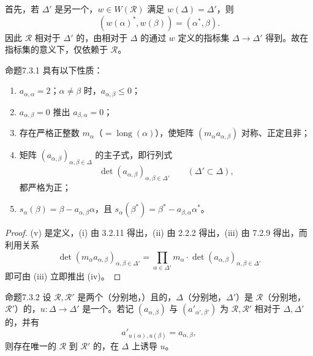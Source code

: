 首先，若 $\Delta'$ 是另一个，$w\in W(\mathscr R)$ 满足 $w(\Delta)=\Delta'$，则
\[(w(\alpha)^*,w(\beta))=(\alpha^*,\beta).\]
因此 $\mathscr R$ 相对于 $\Delta'$ 的，由相对于 $\Delta$ 的通过 $w$ 定义的指标集 $\Delta\to\Delta'$ 得到。故在指标集的意义下，仅依赖于 $\mathscr R$。
\begin{SGAresult}{命题}{7.3.1}
具有以下性质：
\begin{enumerate}
\item[(i)] $a_{\alpha,\alpha}=2$；$\alpha\ne\beta$ 时，$a_{\alpha,\beta}\leq0$；
\item[(ii)] $a_{\alpha,\beta}=0$ 推出 $a_{\beta,\alpha}=0$；
\item[(iii)] 存在严格正整数 $m_\alpha$（$=\operatorname{long}(\alpha)$），使矩阵 $(m_\alpha a_{\alpha,\beta})$ 对称、正定且非；
\item[(iv)] 矩阵 $(a_{\alpha,\beta})_{\alpha,\beta\in\Delta}$ 的主子式，即行列式
\[\det(a_{\alpha,\beta})_{\alpha,\beta\in\Delta'}\qquad(\Delta'\subset\Delta),\]
都严格为正；
\item[(v)] $s_\alpha(\beta)=\beta-a_{\alpha,\beta}\alpha$，且 $s_\alpha(\beta^*)=\beta^*-a_{\beta,\alpha}\alpha^*$。
\end{enumerate}
\end{SGAresult}
\begin{proof}
(v) 是定义，(i) 由 3.2.11 得出，(ii) 由 2.2.2 得出，(iii) 由 7.2.9 得出，而利用关系
\[\det(m_\alpha a_{\alpha,\beta})_{\alpha,\beta\in\Delta'}
=\prod_{\alpha\in\Delta'}m_\alpha\cdot\det(a_{\alpha,\beta})_{\alpha,\beta\in\Delta'}\]
即可由 (iii) 立即推出 (iv)。
\end{proof}
\begin{SGAresult}{命题}{7.3.2}
设 $\mathscr R,\mathscr R'$ 是两个（分别地，）且的，$\Delta$（分别地，$\Delta'$）是 $\mathscr R$（分别地，$\mathscr R'$）的，$u:\Delta\to\Delta'$ 是一个。若记 $(a_{\alpha,\beta})$ 与 $(a'_{\alpha',\beta'})$ 为 $\mathscr R,\mathscr R'$ 相对于 $\Delta,\Delta'$ 的，并有
\[a'_{u(\alpha),u(\beta)}=a_{\alpha,\beta},\]
则存在唯一的 $\mathscr R$ 到 $\mathscr R'$ 的，在 $\Delta$ 上诱导 $u$。
\end{SGAresult}
